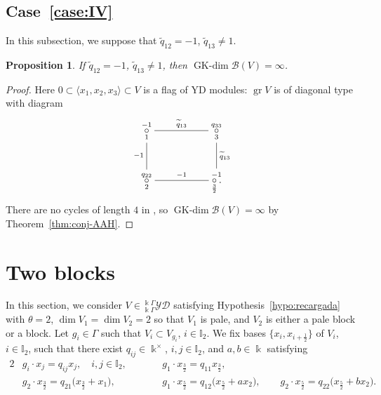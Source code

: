 \documentclass[10pt,a4paper]{amsart}
\numberwithin{equation}{section}
\newtheorem{Proposition}[Theorem]{Proposition}
 { \theoremstyle{definition}
\newtheorem{Definition}[Theorem]{Definition}
\newtheorem{Note}[Theorem]{Note}
\newtheorem{Example}[Theorem]{Example}
\newtheorem{Remark}[Theorem]{Remark} }
\newcommand{\GK}{\operatorname{GK-dim}}
\newcommand{\gr}{\operatorname{gr}}
\newcommand{\toba}{\mathscr B}
\newcommand{\I}{{\mathbb I}}
\newcommand{\yd}[1]{{}_{#1}^{#1}\mathcal{YD}}
\newcommand{\tresdos}{\frac{3}{2}}
\newcommand{\cincodos}{\frac{5}{2}}
\begin{document}
\subsection[Case (IV)]{Case~\ref{case:IV}}
In this subsection, we suppose that $\widetilde{q}_{12}=-1$, $\widetilde{q}_{13} \neq 1$.

\begin{Proposition}\label{prop:caseIV}
If $\widetilde{q}_{12}=-1$, $\widetilde{q}_{13} \neq 1$, then $\GK \toba(V)=\infty$.
\end{Proposition}

\begin{proof} Here $0 \subset \langle x_1, x_2, x_3\rangle \subset V$ is a flag of YD modules: $\gr V$ is of diagonal type with diagram
$$
\xymatrix{
\overset{-1}{\underset{1} {\circ}}\ar @{-}[d]_{-1} \ar @{-}[rr]^{\widetilde{q}_{13}} & & \overset{q_{33}} {\underset{3} {\circ}}\ar @{-}[d]^{\widetilde{q}_{13}} \\
\overset{q_{22}}{\underset{2} {\circ}} \ar @{-}[rr]^{-1} && \overset{-1}{\underset{\tresdos} {\circ}\,.} }
$$
There are no cycles of length $4$ in \cite[Table 3]{H-classif-RS}, so $\GK \toba(V) = \infty$ by Theorem~\ref{thm:conj-AAH}.
\end{proof}


\section{Two blocks}\label{sec:2blocks}
In this section, we consider $V\!\in \yd{\Bbbk\Gamma}$ satisfying Hypothesis~\ref{hypo:recargada}
with $\theta = 2$, ${\dim V_1= \dim V_2 = 2}$ so that $V_1$ is pale, and $V_2$ is either a pale block or a block.
Let $g_i\in\Gamma$ such that $V_i \subset V_{g_i}$, $i\in \I_2$.
We fix bases $\big\{x_i, x_{i+\frac{1}{2}}\big\}$ of $V_i$, $i\in \I_2$,
such that there exist $q_{ij} \in \Bbbk^{\times}$, $i,j\in \I_2$, and $a,b\in \Bbbk$ satisfying
\begin{alignat*}{2}
&g_i\cdot x_j = q_{ij}x_j, \quad i,j\in \I_2,\qquad&& g_1\cdot x_{\tresdos} = q_{11}x_{\tresdos},
\\
&g_2\cdot x_{\tresdos} = q_{21}\big(x_{\tresdos}+x_1\big),&&
g_1\cdot x_{\cincodos} = q_{12}\big(x_{\cincodos} + a x_{2}\big),\qquad
g_2\cdot x_{\cincodos} = q_{22}\big(x_{\cincodos} + b x_{2}\big).
\end{alignat*}
\end{document}
